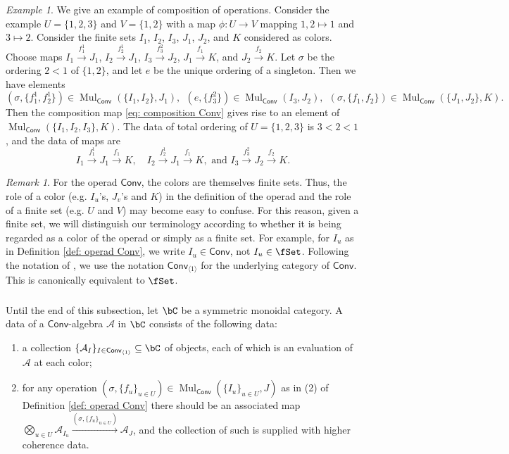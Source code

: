 \documentclass[10pt]{amsart}
\newcommand{\sssec}{\subsubsection}
\theoremstyle{remark}
\newtheorem{rmk}[subsubsection]{Remark}
\newtheorem{ex}[subsubsection]{Example}
\newcommand{\te}{\text}
\newcommand{\on}{\operatorname}
\newcommand{\cA}{\mathcal{A}}
\newcommand{\Mul}{\on{Mul}}
\newcommand{\Conv}{\mathsf{Conv}}
\begin{document}
\begin{ex}
    We give an example of composition of operations. Consider the example $U=\{1,2,3\}$ and $V=\{1,2\}$ with a map $\phi:U\rightarrow V$ mapping $1,2\mapsto 1$ and $3\mapsto 2$. Consider the finite sets $I_1$, $I_2$, $I_3$, $J_1$, $J_2$, and $K$ considered as colors. Choose maps $I_1\xrightarrow{f^1_1} J_1$, $I_2\xrightarrow{f^1_2} J_1$, $I_3\xrightarrow{f^2_3} J_2$, $J_1\xrightarrow{f_1} K$, and $J_2\xrightarrow{f_2} K$. Let $\sigma$ be the ordering $2<1$ of $\{1,2\}$, and let $e$ be the unique ordering of a singleton. Then we have elements
    \[(\sigma,\{f^1_1,f^1_2\})\in \Mul_{\Conv}(\{I_1,I_2\},J_1),\ \ (e,\{f^2_3\})\in\Mul_{\Conv}(I_3,J_2),\ \ (\sigma, \{f_1,f_2\})\in \Mul_{\Conv}(\{J_1,J_2\},K).\]
    Then the composition map \eqref{eq: composition Conv} gives rise to  an element of $\Mul_{\Conv}(\{I_1,I_2,I_3\},K)$. The data of total ordering of $U=\{1,2,3\}$ is $3<2<1$, and the data of maps are 
    \[I_1\xrightarrow{f^1_1}J_1\xrightarrow{f_1}K,\quad I_2\xrightarrow{f^1_2}J_1\xrightarrow{f_1}K,\te{ and } I_3\xrightarrow{f^2_3}J_2\xrightarrow{f_2}K.\]
\end{ex}

\begin{rmk}
    For the operad $\Conv$, the colors are themselves finite sets. Thus, the role of a color (e.g. $I_u$'s, $J_v$'s and $K$) in the definition of the operad and the role of a finite set (e.g. $U$ and $V$) may become easy to confuse. For this reason, given a finite set, we will distinguish our terminology according to whether it is being regarded as a color of the operad or simply as a finite set. For example, for $I_u$ as in Definition \ref{def: operad Conv}, we write $I_u\in\Conv$, not $I_u\in\fSet$. Following the notation of \cite[Remark 2.1.1.12]{HA}, we use the notation $\Conv_{\langle 1\rangle}$ for the underlying category of $\Conv$. This is canonically equivalent to $\fSet$.
\end{rmk}

\sssec{}\label{sssec: Conv algebra object}
Until the end of this subsection, let $\bC$ be a symmetric monoidal category.
A data of a $\Conv$-algebra $\cA$ in $\bC$ consists of the following data: 
\begin{enumerate}
    \item a collection $\{\cA_I\}_{I\in\Conv_{\langle 1\rangle}}\subseteq \bC$ of objects, each of which is an evaluation of $\cA$ at each color;
    \item for any operation $(\sigma,\{f_u\}_{u\in U})\in \Mul_{\Conv}(\{I_u\}_{u\in U},J)$ as in (2) of Definition \ref{def: operad Conv} there should be an associated map $\bigotimes_{u\in U}\cA_{I_u}\xrightarrow{(\sigma,\{f_u\}_{u\in U})}\cA_J$, and the collection of such is supplied with higher coherence data.
\end{enumerate}
\end{document}
